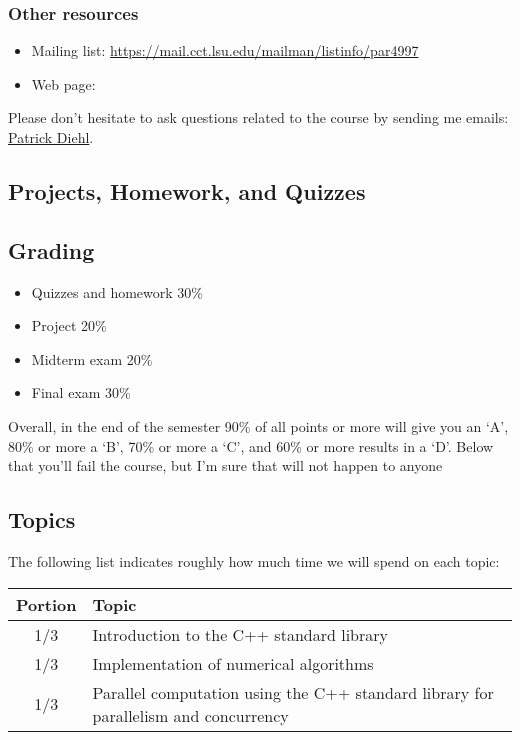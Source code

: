 \documentclass[11pt,letterpaper]{article}
\begin{document}
\subsubsection*{Other resources}

\begin{itemize}
\item Mailing list: \url{https://mail.cct.lsu.edu/mailman/listinfo/par4997}
\item Web page:
\end{itemize}

Please don’t hesitate to ask questions related to the course by sending me emails: \href{mailto:patrickdiehl@lsu.edu}{Patrick Diehl}. 


\subsection*{Projects, Homework, and Quizzes}


\subsection*{Grading}

\begin{itemize}
\item Quizzes and homework 30\%
\item Project 20\%
\item Midterm exam 20\%
\item Final exam 30\%
\end{itemize}
Overall, in the end of the semester 90\% of all points or more will give you an ‘A’, 80\% or more a ‘B’, 70\% or more a ‘C’, and 60\% or more results in a ‘D’. Below that you’ll fail the course, but I’m sure that will not happen to anyone

\subsection*{Topics}

The following list indicates roughly how much time we will spend on each topic:

\begin{table}[h!]
\centering
\begin{tabular}{cl}
\hline
Portion & Topic \\
\hline
1/3 & Introduction to the C++ standard library\\
1/3 & Implementation of numerical algorithms\\
1/3 & Parallel computation using the C++ standard library for parallelism and concurrency \\
\hline
\end{tabular}
\end{table}
\end{document}
